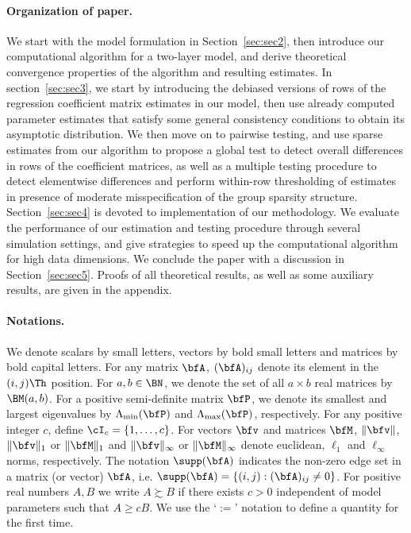 \paragraph{Organization of paper.}
We start with the model formulation in Section~\ref{sec:sec2}, then introduce our computational algorithm for a two-layer model, and derive theoretical convergence properties of the algorithm and resulting estimates. In section~\ref{sec:sec3}, we start by introducing the debiased versions of rows of the regression coefficient matrix estimates in our model, then use already computed parameter estimates that satisfy some general consistency conditions to obtain its asymptotic distribution. We then move on to pairwise testing, and use sparse estimates from our algorithm to propose a global test to detect overall differences in rows of the coefficient matrices, as well as a multiple testing procedure to detect elementwise differences and perform within-row thresholding of estimates in presence of moderate misspecification of the group sparsity structure. Section~\ref{sec:sec4} is devoted to implementation of our methodology. We evaluate the performance of our estimation and testing procedure through several simulation settings, and give strategies to speed up the computational algorithm for high data dimensions.  We conclude the paper with a discussion in Section~\ref{sec:sec5}. Proofs of all theoretical results, as well as some auxiliary results, are given in the appendix.

\paragraph{Notations.}
We denote scalars by small letters, vectors by bold small letters and matrices by bold capital letters. For any matrix $\bfA$, $(\bfA)_{ij}$ denote its element in the $(i,j)\Th$ position. For $a,b \in \BN$, we denote the set of all $a \times b$ real matrices by $\BM(a,b)$. For a positive semi-definite matrix $\bfP$, we denote its smallest and largest eigenvalues by $\Lambda_{\min} (\bfP)$ and $\Lambda_{\max} (\bfP)$, respectively. For any positive integer $c$, define $\cI_c = \{ 1, \ldots, c\}$. For vectors $\bfv$ and matrices $\bfM$, $\| \bfv \|$, $\|\bfv \|_1$ or $\|\bfM \|_1$ and $\|\bfv \|_\infty$ or $\|\bfM \|_\infty$ denote euclidean, $\ell_1$ and $\ell_\infty$ norms, respectively. The notation $\supp(\bfA)$ indicates the non-zero edge set in a matrix (or vector) $\bfA$, i.e. $\supp(\bfA) = \{(i,j): (\bfA)_{ij} \neq 0\}$. For positive real numbers $A, B$ we write $A \succsim B$ if there exists $c>0$ independent of model parameters such that $A \geq cB$. We use the `$:=$' notation to define a quantity for the first time.
